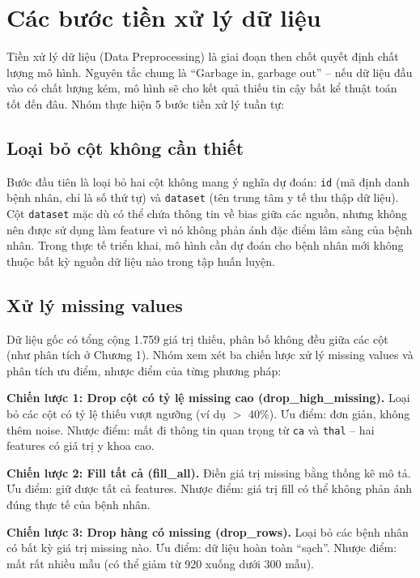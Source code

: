 \section{Các bước tiền xử lý dữ liệu}

Tiền xử lý dữ liệu (Data Preprocessing) là giai đoạn then chốt quyết định chất lượng mô hình. Nguyên tắc chung là ``Garbage in, garbage out'' -- nếu dữ liệu đầu vào có chất lượng kém, mô hình sẽ cho kết quả thiếu tin cậy bất kể thuật toán tốt đến đâu. Nhóm thực hiện 5 bước tiền xử lý tuần tự:

\subsection{Loại bỏ cột không cần thiết}

Bước đầu tiên là loại bỏ hai cột không mang ý nghĩa dự đoán: \texttt{id} (mã định danh bệnh nhân, chỉ là số thứ tự) và \texttt{dataset} (tên trung tâm y tế thu thập dữ liệu). Cột \texttt{dataset} mặc dù có thể chứa thông tin về bias giữa các nguồn, nhưng không nên được sử dụng làm feature vì nó không phản ánh đặc điểm lâm sàng của bệnh nhân. Trong thực tế triển khai, mô hình cần dự đoán cho bệnh nhân mới không thuộc bất kỳ nguồn dữ liệu nào trong tập huấn luyện.

\subsection{Xử lý missing values}

Dữ liệu gốc có tổng cộng 1.759 giá trị thiếu, phân bố không đều giữa các cột (như phân tích ở Chương 1). Nhóm xem xét ba chiến lược xử lý missing values và phân tích ưu điểm, nhược điểm của từng phương pháp:

\textbf{Chiến lược 1: Drop cột có tỷ lệ missing cao (drop\_high\_missing).} Loại bỏ các cột có tỷ lệ thiếu vượt ngưỡng (ví dụ $>$ 40\%). Ưu điểm: đơn giản, không thêm noise. Nhược điểm: mất đi thông tin quan trọng từ \texttt{ca} và \texttt{thal} -- hai features có giá trị y khoa cao.

\textbf{Chiến lược 2: Fill tất cả (fill\_all).} Điền giá trị missing bằng thống kê mô tả. Ưu điểm: giữ được tất cả features. Nhược điểm: giá trị fill có thể không phản ánh đúng thực tế của bệnh nhân.

\textbf{Chiến lược 3: Drop hàng có missing (drop\_rows).} Loại bỏ các bệnh nhân có bất kỳ giá trị missing nào. Ưu điểm: dữ liệu hoàn toàn ``sạch''. Nhược điểm: mất rất nhiều mẫu (có thể giảm từ 920 xuống dưới 300 mẫu).

